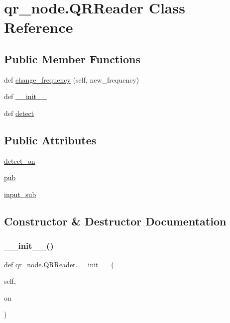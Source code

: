 \hypertarget{classqr__node_1_1QRReader}{}\section{qr\+\_\+node.\+Q\+R\+Reader Class Reference}
\label{classqr__node_1_1QRReader}
\subsection*{Public Member Functions}
\begin{DoxyCompactItemize}
\item 
def \hyperlink{classqr__node_1_1QRReader_a9deeca088b16e8f405b93f5aba0279b9}{change\+\_\+frequency} (self, new\+\_\+frequency)
\item 
def \hyperlink{classqr__node_1_1QRReader_a8bdb6554041e23d119193693fb00f0d7}{\+\_\+\+\_\+init\+\_\+\+\_\+}
\item 
def \hyperlink{classqr__node_1_1QRReader_af0a251fd81078c55ace9103a7a5aa1f3}{detect}
\end{DoxyCompactItemize}
\subsection*{Public Attributes}
\begin{DoxyCompactItemize}
\item 
\hyperlink{classqr__node_1_1QRReader_aa4b1efb2e1bfd13ca80ec776ebb997ab}{detect\+\_\+on}
\item 
\hyperlink{classqr__node_1_1QRReader_a92f0f6e040949958ea00baa779d28f33}{pub}
\item 
\hyperlink{classqr__node_1_1QRReader_af7f2d3f8c130612a494d4add165ef77a}{input\+\_\+sub}
\end{DoxyCompactItemize}


\subsection{Constructor \& Destructor Documentation}
\mbox{\label{classqr__node_1_1QRReader_a8bdb6554041e23d119193693fb00f0d7}} 
\subsubsection{\texorpdfstring{\+\_\+\+\_\+init\+\_\+\+\_\+()}{\_\_init\_\_()}}
{\footnotesize\ttfamily def qr\+\_\+node.\+Q\+R\+Reader.\+\_\+\+\_\+init\+\_\+\+\_\+ (\begin{DoxyParamCaption}\item[{}]{self,  }\item[{}]{on }\end{DoxyParamCaption})}



